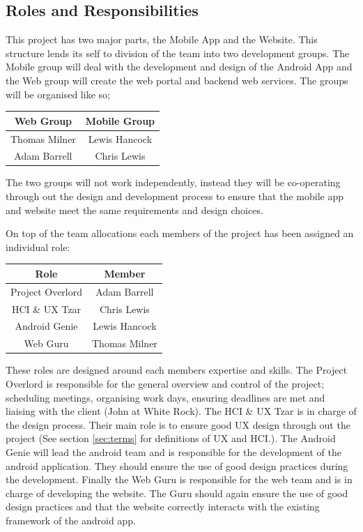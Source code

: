 \documentclass[11pt,a4paper]{article}
\begin{document}
\subsection{Roles and Responsibilities}
This project has two major parts, the Mobile App and the Website. This structure lends its self to division of the team into two development groups. The Mobile group will deal with the development and design of the Android App and the Web group will create the web portal and backend web services. The groups will be organised like so;  
\begin{table}[h]
\begin{center}
\begin{tabular}{|c|c|}
\hline
\textbf{Web Group} & \textbf{Mobile Group} \\
\hline
Thomas Milner & Lewis Hancock \\
Adam Barrell & Chris Lewis \\ \hline
\end{tabular}
\end{center}
\end{table}%

The two groups will not work independently, instead they will be co-operating through out the design and development process to ensure that the mobile app and website meet the same requirements and design choices. 

On top of the team allocations each members of the project has been assigned an individual role:

\begin{table}[h]
\begin{center}
\begin{tabular}{|c|c|}
\hline
\textbf{Role} & \textbf{Member} \\
\hline
Project Overlord & Adam Barrell  \\\hline
HCI \& UX Tzar & Chris Lewis \\ \hline
Android Genie & Lewis Hancock \\\hline
Web Guru & Thomas Milner \\\hline
\end{tabular}
\end{center}
\end{table}%

These roles are designed around each members expertise and skills. The Project Overlord is responsible for the general overview and control of the project; scheduling meetings, organising work days, ensuring deadlines are met and liaising with the client (John at White Rock). The HCI \& UX Tzar is in charge of the design process. Their main role is to ensure good UX design through out the project (See section \ref{sec:terms} for definitions of UX and HCI.). The Android Genie will lead the android team and is responsible for the development of the android application. They should ensure the use of good design practices during the development. Finally the Web Guru is responsible for the web team and is in charge of developing the website. The Guru should again ensure the use of good design practices and that the website correctly interacts with the existing framework of the android app. 
\end{document}
